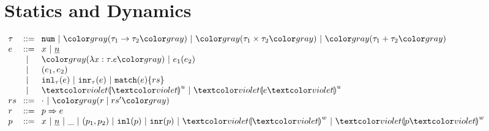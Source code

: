 \section{Statics and Dynamics}
$\arraycolsep=4pt\begin{array}{lll}
\tau & ::= &
  \tnum ~\vert~
  \tarr{\tau_1}{\tau_2} ~\vert~
  \tprod{\tau_1}{\tau_2} ~\vert~
  \tsum{\tau_1}{\tau_2} \\
e & ::= &
  x ~\vert~
  \hnum{n} \\
  & ~\vert~ &
  \hlam{x}{\tau}{e} ~\vert~
  \hap{e_1}{e_2} \\
  & ~\vert~ &
  \hpair{e_1}{e_2} \\
  & ~\vert~ &
  \hinl{\tau}{e} ~\vert~
  \hinr{\tau}{e} ~\vert~
  \hmatch{e}{rs} \\
  & ~\vert~ &
  \hehole{u} ~\vert~
  \hhole{e}{u} \\
rs & ::= &
  \cdot ~\vert~ \hrulesP{r}{rs'} \\
r & ::= &
  \hrul{p}{e} \\
p & ::= &
  x ~\vert~
  \hnum{n} ~\vert~
  \_ ~\vert~
  \hpair{p_1}{p_2} ~\vert~
  \hinlp{p} ~\vert~
  \hinrp{p} ~\vert~
  \hehole{w} ~\vert~
  \hhole{p}{w}
\end{array}$

